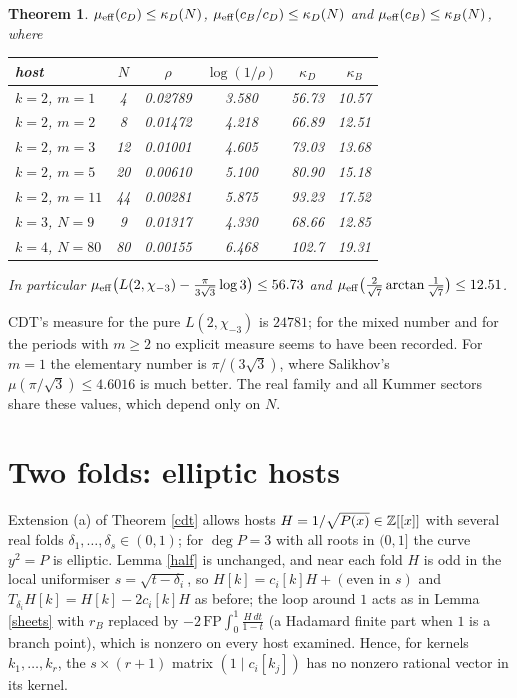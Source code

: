 \documentclass[11pt]{amsart}
\newtheorem{theorem}{Theorem}[section]
\theoremstyle{remark}
\begin{document}
\begin{theorem}\label{E}
$\mu_{\rm eff}(c_D)\le\kappa_D(N)$, $\mu_{\rm eff}(c_B/c_D)\le\kappa_D(N)$ and $\mu_{\rm eff}(c_B)\le\kappa_B(N)$, where
\begin{center}\begin{tabular}{@{}lccccc@{}}\toprule
host & $N$ & $\rho$ & $\log(1/\rho)$ & $\kappa_D$ & $\kappa_B$\\\midrule
$k=2$, $m=1$ & 4 & 0.02789 & 3.580 & 56.73 & 10.57\\
$k=2$, $m=2$ & 8 & 0.01472 & 4.218 & 66.89 & 12.51\\
$k=2$, $m=3$ & 12 & 0.01001 & 4.605 & 73.03 & 13.68\\
$k=2$, $m=5$ & 20 & 0.00610 & 5.100 & 80.90 & 15.18\\
$k=2$, $m=11$ & 44 & 0.00281 & 5.875 & 93.23 & 17.52\\
$k=3$, $N=9$ & 9 & 0.01317 & 4.330 & 68.66 & 12.85\\
$k=4$, $N=80$ & 80 & 0.00155 & 6.468 & 102.7 & 19.31\\\bottomrule
\end{tabular}\end{center}
In particular $\mu_{\rm eff}\bigl(L(2,\chi_{-3})-\frac{\pi}{3\sqrt3}\log3\bigr)\le56.73$ and $\mu_{\rm eff}\bigl(\frac2{\sqrt7}\arctan\frac1{\sqrt7}\bigr)\le12.51$.
\end{theorem}

CDT's measure for the pure $L(2,\chi_{-3})$ is $24781$; for the mixed number and for the periods with $m\ge2$ no explicit measure seems to have been recorded. For $m=1$ the elementary number is $\pi/(3\sqrt3)$, where Salikhov's $\mu(\pi/\sqrt3)\le4.6016$ is much better. The real family and all Kummer sectors share these values, which depend only on $N$.

\section{Two folds: elliptic hosts}
Extension (a) of Theorem \ref{cdt} allows hosts $H=1/\sqrt{P(x)}\in\mathbb Z[[x]]$ with several real folds $\delta_1,\dots,\delta_s\in(0,1)$; for $\deg P=3$ with all roots in $(0,1]$ the curve $y^2=P$ is elliptic. Lemma \ref{half} is unchanged, and near each fold $H$ is odd in the local uniformiser $s=\sqrt{t-\delta_i}$, so $H[k]=c_i[k]H+(\text{even in }s)$ and $T_{\delta_i}H[k]=H[k]-2c_i[k]H$ as before; the loop around $1$ acts as in Lemma \ref{sheets} with $r_B$ replaced by $-2\,\mathrm{FP}\!\int_0^1\frac{H\,dt}{1-t}$ (a Hadamard finite part when $1$ is a branch point), which is nonzero on every host examined. Hence, for kernels $k_1,\dots,k_r$, the $s\times(r+1)$ matrix $(1\mid c_i[k_j])$ has no nonzero rational vector in its kernel.
\end{document}
